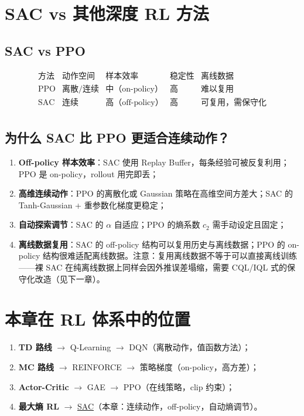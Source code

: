 \documentclass{article}
\begin{document}
\section*{SAC vs 其他深度 RL 方法}

\subsection*{SAC vs PPO}

\[
\begin{array}{c|c|c|c|c}
\text{方法} & \text{动作空间} & \text{样本效率} & \text{稳定性} & \text{离线数据} \\
\hline
\text{PPO} & \text{离散/连续} & \text{中（on-policy）}  & \text{高} & \text{难以复用} \\
\text{SAC} & \text{连续}     & \text{高（off-policy）} & \text{高} & \text{可复用，需保守化} \\
\end{array}
\]

\subsection*{为什么 SAC 比 PPO 更适合连续动作？}

\begin{enumerate}
  \item \textbf{Off-policy 样本效率}：SAC 使用 Replay Buffer，每条经验可被反复利用；PPO 是 on-policy，rollout 用完即丢；
  \item \textbf{高维连续动作}：PPO 的离散化或 Gaussian 策略在高维空间方差大；SAC 的 Tanh-Gaussian + 重参数化梯度更稳定；
  \item \textbf{自动探索调节}：SAC 的 $\alpha$ 自适应；PPO 的熵系数 $c_2$ 需手动设定且固定；
  \item \textbf{离线数据复用}：SAC 的 off-policy 结构可以复用历史与离线数据；PPO 的 on-policy 结构很难适配离线数据。注意：复用离线数据不等于可以直接离线训练——裸 SAC 在纯离线数据上同样会因外推误差塌缩，需要 CQL/IQL 式的保守化改造（见下一章）。
\end{enumerate}


\section*{本章在 RL 体系中的位置}

\begin{enumerate}
  \item \textbf{TD 路线} $\to$ Q-Learning $\to$ DQN（离散动作，值函数方法）；
  \item \textbf{MC 路线} $\to$ REINFORCE $\to$ 策略梯度（on-policy，高方差）；
  \item \textbf{Actor-Critic} $\to$ GAE $\to$ PPO（在线策略，clip 约束）；
  \item \textbf{最大熵 RL} $\to$ \underline{SAC}（本章：连续动作，off-policy，自动熵调节）。
\end{enumerate}
\end{document}
